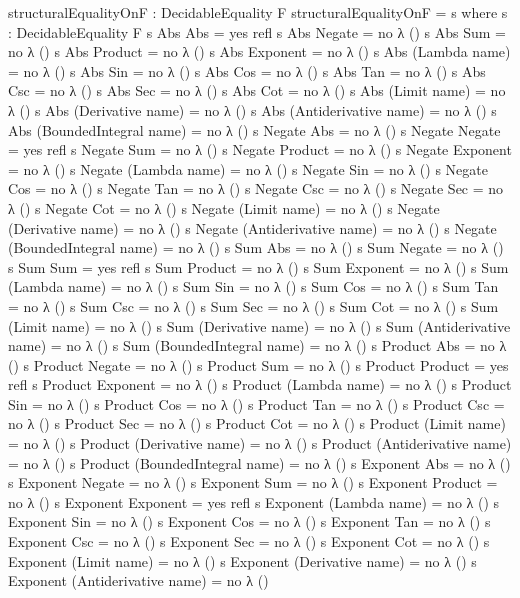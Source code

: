 \documentclass{report}
\begin{document}
\begin{code}
  structuralEqualityOnF : DecidableEquality F
  structuralEqualityOnF = s
    where
    s : DecidableEquality F
    s Abs Abs = yes refl
    s Abs Negate = no λ ()
    s Abs Sum = no λ ()
    s Abs Product = no λ ()
    s Abs Exponent = no λ ()
    s Abs (Lambda name) = no λ ()
    s Abs Sin = no λ ()
    s Abs Cos = no λ ()
    s Abs Tan = no λ ()
    s Abs Csc = no λ ()
    s Abs Sec = no λ ()
    s Abs Cot = no λ ()
    s Abs (Limit name) = no λ ()
    s Abs (Derivative name) = no λ ()
    s Abs (Antiderivative name) = no λ ()
    s Abs (BoundedIntegral name) = no λ ()
    s Negate Abs = no λ ()
    s Negate Negate = yes refl
    s Negate Sum = no λ ()
    s Negate Product = no λ ()
    s Negate Exponent = no λ ()
    s Negate (Lambda name) = no λ ()
    s Negate Sin = no λ ()
    s Negate Cos = no λ ()
    s Negate Tan = no λ ()
    s Negate Csc = no λ ()
    s Negate Sec = no λ ()
    s Negate Cot = no λ ()
    s Negate (Limit name) = no λ ()
    s Negate (Derivative name) = no λ ()
    s Negate (Antiderivative name) = no λ ()
    s Negate (BoundedIntegral name) = no λ ()
    s Sum Abs = no λ ()
    s Sum Negate = no λ ()
    s Sum Sum = yes refl
    s Sum Product = no λ ()
    s Sum Exponent = no λ ()
    s Sum (Lambda name) = no λ ()
    s Sum Sin = no λ ()
    s Sum Cos = no λ ()
    s Sum Tan = no λ ()
    s Sum Csc = no λ ()
    s Sum Sec = no λ ()
    s Sum Cot = no λ ()
    s Sum (Limit name) = no λ ()
    s Sum (Derivative name) = no λ ()
    s Sum (Antiderivative name) = no λ ()
    s Sum (BoundedIntegral name) = no λ ()
    s Product Abs = no λ ()
    s Product Negate = no λ ()
    s Product Sum = no λ ()
    s Product Product = yes refl
    s Product Exponent = no λ ()
    s Product (Lambda name) = no λ ()
    s Product Sin = no λ ()
    s Product Cos = no λ ()
    s Product Tan = no λ ()
    s Product Csc = no λ ()
    s Product Sec = no λ ()
    s Product Cot = no λ ()
    s Product (Limit name) = no λ ()
    s Product (Derivative name) = no λ ()
    s Product (Antiderivative name) = no λ ()
    s Product (BoundedIntegral name) = no λ ()
    s Exponent Abs = no λ ()
    s Exponent Negate = no λ ()
    s Exponent Sum = no λ ()
    s Exponent Product = no λ ()
    s Exponent Exponent = yes refl
    s Exponent (Lambda name) = no λ ()
    s Exponent Sin = no λ ()
    s Exponent Cos = no λ ()
    s Exponent Tan = no λ ()
    s Exponent Csc = no λ ()
    s Exponent Sec = no λ ()
    s Exponent Cot = no λ ()
    s Exponent (Limit name) = no λ ()
    s Exponent (Derivative name) = no λ ()
    s Exponent (Antiderivative name) = no λ ()

\end{code}
\end{document}
